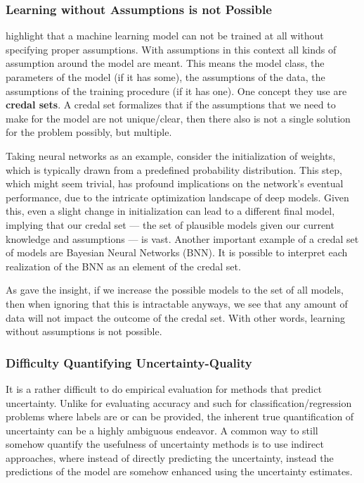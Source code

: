 \documentclass{article}
\begin{document}
\subsubsection{Learning without Assumptions is not Possible}
\cite{hullermeier_aleatoric_2021} highlight that a machine learning model can not be trained at all without specifying proper assumptions. With assumptions in this context all kinds of assumption around the model are meant. This means the model class, the parameters of the model (if it has some), the assumptions of the data, the assumptions of the training procedure (if it has one). One concept they use are \textbf{credal sets}. A credal set formalizes that if the assumptions that we need to make for the model are not unique/clear, then there also is not a single solution for the problem possibly, but multiple.

Taking neural networks as an example, consider the initialization of weights, which is typically drawn from a predefined probability distribution. This step, which might seem trivial, has profound implications on the network's eventual performance, due to the intricate optimization landscape of deep models. Given this, even a slight change in initialization can lead to a different final model, implying that our credal set — the set of plausible models given our current knowledge and assumptions — is vast. Another important example of a credal set of models are Bayesian Neural Networks (BNN). It is possible to interpret each realization of the BNN as an element of the credal set.

As \cite{wolpert_1996} gave the insight, if we increase the possible models to the set of all models, then when ignoring that this is intractable anyways, we see that any amount of data will not impact the outcome of the credal set. With other words, learning without assumptions is not possible.

\subsubsection{Difficulty Quantifying Uncertainty-Quality}

It is a rather difficult to do empirical evaluation for methods that predict uncertainty. Unlike for evaluating accuracy and such for classification/regression problems where labels are or can be provided, the inherent true quantification of uncertainty can be a highly ambiguous endeavor. A common way to still somehow quantify the usefulness of uncertainty methods is to use indirect approaches, where instead of directly predicting the uncertainty, instead the predictions of the model are somehow enhanced using the uncertainty estimates.
\end{document}
